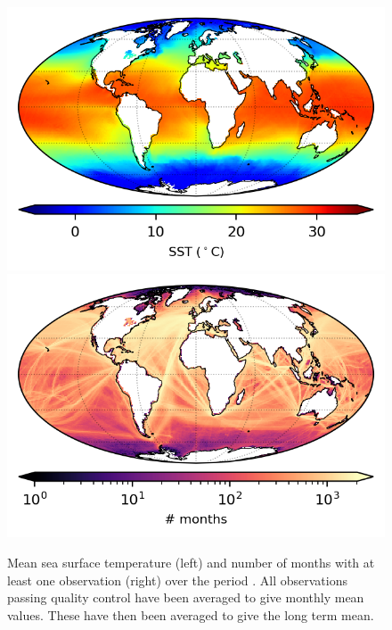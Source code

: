 \begin{figure}[h]
    \includegraphics{resources/observations-sst-mean-map-optimal.png}
    \includegraphics{resources/observations-sst-months-map-optimal.png}
    \caption{Mean sea surface temperature (left) and number of months with at least one observation (right) over the period \datatimerange{}. All observations passing quality control have been averaged to give monthly mean values. These have then been averaged to give the long term mean. \\}
    \label{fig:sst-map}
\end{figure}

\FloatBarrier
